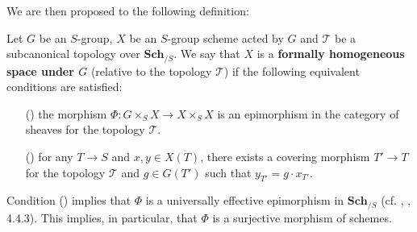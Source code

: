 We are then proposed to the following definition:

\begin{definition}
Let $G$ be an $S$-group, $X$ be an $S$-group scheme acted by $G$ and $\mathcal{T}$ be a subcanonical topology over $\mathbf{Sch}_{/S}$. We say that $X$ is a \textbf{formally homogeneous space under $G$} (relative to the topology $\mathcal{T}$) if the following equivalent conditions are satisfied:
\begin{enumerate}
    \item[(\rmnum{1})] the morphism $\Phi:G\times_SX\to X\times_SX$ is an epimorphism in the category of sheaves for the topology $\mathcal{T}$.
    \item[(\rmnum{2})] for any $T\to S$ and $x,y\in X(T)$, there exists a covering morphism $T'\to T$ for the topology $\mathcal{T}$ and $g\in G(T')$ such that $y_{T'}=g\cdot x_{T'}$.
\end{enumerate}
\end{definition}

\begin{remark}
Condition () implies that $\Phi$ is a universally effective epimorphism in $\mathbf{Sch}_{/S}$ (cf. \cite{SGA3}, , 4.4.3). This implies, in particular, that $\Phi$ is a surjective morphism of schemes.
\end{remark}

